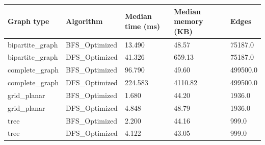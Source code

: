 \begin{tabular}{lllll}
\toprule
Graph type & Algorithm & Median time (ms) & Median memory (KB) & Edges \\
\midrule
bipartite\_graph & BFS\_Optimized & 13.490 & 48.57 & 75187.0 \\
bipartite\_graph & DFS\_Optimized & 41.326 & 659.13 & 75187.0 \\
complete\_graph & BFS\_Optimized & 96.790 & 49.60 & 499500.0 \\
complete\_graph & DFS\_Optimized & 224.583 & 4110.82 & 499500.0 \\
grid\_planar & BFS\_Optimized & 1.680 & 44.20 & 1936.0 \\
grid\_planar & DFS\_Optimized & 4.848 & 48.79 & 1936.0 \\
tree & BFS\_Optimized & 2.200 & 44.16 & 999.0 \\
tree & DFS\_Optimized & 4.122 & 43.05 & 999.0 \\
\bottomrule
\end{tabular}
